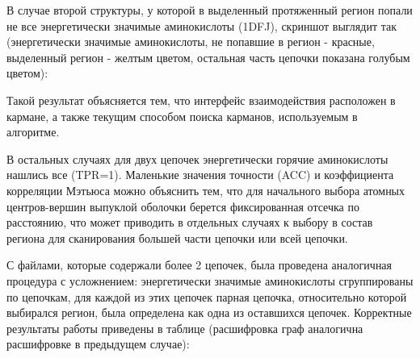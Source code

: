В случае второй структуры, у которой в выделенный протяженный регион попали не все энергетически значимые аминокислоты (1DFJ), скриншот выглядит так (энергетически значимые аминокислоты, не попавшие в регион - красные, выделенный регион - желтым цветом, остальная часть цепочки показана голубым цветом):


Такой результат объясняется тем, что интерфейс взаимодействия расположен в кармане, а также текущим способом поиска карманов, используемым в алгоритме.

В остальных случаях для двух цепочек энергетически горячие аминокислоты нашлись все (TPR=1). Маленькие значения точности (ACC) и коэффициента корреляции Мэтьюса можно объяснить тем, что для начального выбора атомных центров-вершин выпуклой оболочки берется фиксированная отсечка по расстоянию, что может приводить в отдельных случаях к выбору в состав региона для сканирования большей части цепочки или всей цепочки.

С файлами, которые содержали более 2 цепочек, была проведена аналогичная процедура с усложнением: энергетически значимые аминокислоты сгруппированы по цепочкам, для каждой из этих цепочек парная цепочка, относительно которой выбирался регион, была определена как одна из оставшихся цепочек. Корректные результаты работы приведены в таблице (расшифровка граф аналогична расшифровке в предыдущем случае):

